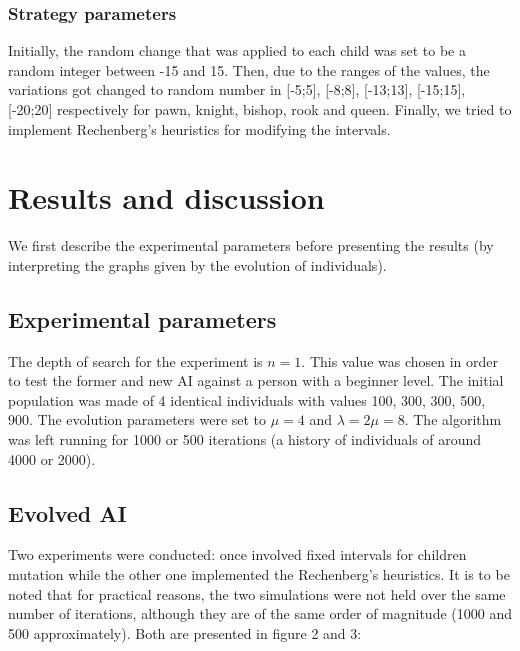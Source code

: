 \documentclass[12pt,a4paper,twocolumn]{article}
\begin{document}
\subsubsection{Strategy parameters}
Initially, the random change that was applied to each child was set to be a random integer between -15 and 15. Then, due to the ranges of the values, the variations got changed to random number in [-5;5], [-8;8], [-13;13], [-15;15], [-20;20] respectively for pawn, knight, bishop, rook and queen. Finally, we tried to implement Rechenberg's heuristics for modifying the intervals.

\section{Results and discussion}
We first describe the experimental parameters before presenting the results (by interpreting the graphs given by the evolution of individuals).

\subsection{Experimental parameters}
The depth of search for the experiment is $n = 1$. This value was chosen in order to test the former and new AI against a person with a beginner level. The initial population was made of 4 identical individuals with values 100, 300, 300, 500, 900. The evolution parameters were set to $\mu = 4$ and $\lambda = 2\mu = 8$. The algorithm was left running for 1000 or 500 iterations (a history of individuals of around 4000 or 2000).

\subsection{Evolved AI}
Two experiments were conducted: once involved fixed intervals for children mutation while the other one implemented the Rechenberg's heuristics. It is to be noted that for practical reasons, the two simulations were not held over the same number of iterations, although they are of the same order of magnitude (1000 and 500 approximately). Both are presented in figure 2 and 3:
\end{document}
